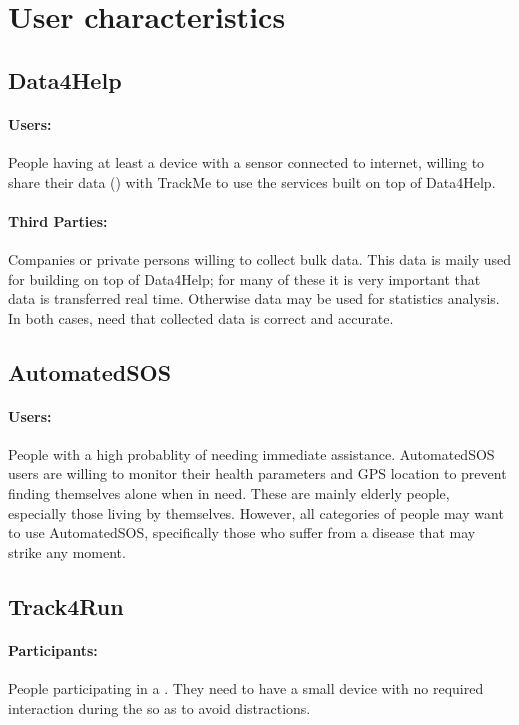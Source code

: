 \documentclass[../../rasd.tex]{subfiles}
\begin{document}
\section{User characteristics}
			\subsection{Data4Help}
				\paragraph{Users:}
				People having at least a device with a sensor connected to internet, willing to share their data () with TrackMe to use the services built on top of Data4Help.
				\paragraph{Third Parties:}
				Companies or private persons willing to collect bulk data. This data is maily used for building  on top of Data4Help; for many of these  it is very important that data is transferred real time. Otherwise data may be used for statistics analysis. In both cases,  need that collected data is correct and accurate.

			\subsection{AutomatedSOS}
				\paragraph{Users:}
				People with a high probablity of needing immediate assistance. AutomatedSOS users are willing to monitor their health parameters and GPS location to prevent finding themselves alone when in need. These are mainly elderly people, especially those living by themselves. However, all categories of people may want to use AutomatedSOS, specifically those who suffer from a disease that may strike any moment.

			\subsection{Track4Run}
				\paragraph{Participants:}
				People participating in a . They need to have a small device with no required interaction during the  so as to avoid distractions.
\end{document}
